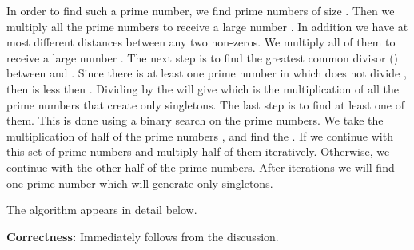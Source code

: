 \documentclass[11pt,amssymb]{article}
\begin{document}
In order to find such a prime number, we find  prime numbers of
size . Then we multiply all the prime numbers to receive a
large number . In addition we have at most  different
distances between any two non-zeros. We multiply all of them to
receive a large number . The next step is to find the greatest
common divisor () between  and . Since there is at least
one prime number in  which does not divide , then 
is less then . Dividing  by the  will give  which
is the multiplication of all the prime numbers that create only
singletons. The last step is to find at least one of them. This is
done using a binary search on the prime numbers. We take the
multiplication of half of the prime numbers , and find the
. If  we continue with this set of prime
numbers and multiply half of them iteratively. Otherwise, we
continue with the other half of the prime numbers. After  iterations we will find one prime number which will generate
only singletons.

The algorithm appears in detail below.


{\bf Correctness:} Immediately follows from the discussion.
\end{document}
